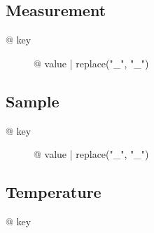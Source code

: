 \subsection{Measurement}

\begin{description}
\item[{@ key }] {@ value | replace("_", "\_") }
\end{description}

\subsection{Sample}

\begin{description}
\item[{@ key }] {@ value | replace("_", "\_") }
\end{description}

\subsection{Temperature}

\begin{description}
\item[{@ key }] %

\end{description}
